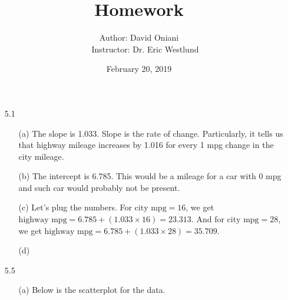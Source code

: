 \documentclass[11pt, a4paper]{article}
\title{\bf{Homework \textnumero 5}}
\author{Author: David Oniani
\\
\ \ \ Instructor: Dr. Eric Westlund}
\date{February 20, 2019}
\begin{document}
\maketitle
\begin{itemize}
\item[5.1]
\begin{itemize}
\item[(a)]
The slope is 1.033. Slope is the rate of change. Particularly,
it tells us that highway mileage increases by 1.016 for every
1 mpg change in the city mileage.

\item[]

\item[(b)]
The intercept is 6.785. This would be a mileage for a car
with 0 mpg and such car would probably not be present.

\item[]

\item[(c)]
Let's plug the numbers. For $\text{city mpg} = 16$, we get $\text{highway mpg} = 6.785 + (1.033 \times 16) = 23.313$. And for $\text{city mpg} = 28$, we get $\text{highway mpg} = 6.785 + (1.033 \times 28) = 35.709$.

\item[]

\item[(d)]
\item[]
\item[]
\begin{center}
\end{center}
\item[]
\item[]
\end{itemize}

\newpage

\item[5.5]
\begin{itemize}
\item[(a)]
Below is the scatterplot for the data.


\end{itemize}
\end{itemize}
\end{document}
